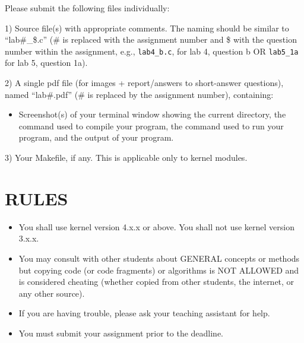 \documentclass{article}
\begin{document}
Please submit the following files individually:

1) Source file(s) with appropriate comments. The naming should be similar to “lab\#\_\$.c” (\# is replaced with the assignment number and \$ with the question number within the assignment, e.g., \texttt{lab4\_b.c}, for lab 4, question b OR \texttt{lab5\_1a} for lab 5, question 1a).

2) A single pdf file (for images + report/answers to short-answer questions), named “lab\#.pdf” (\# is replaced by the assignment number), containing:
    \begin{itemize}
        \item Screenshot(s) of your terminal window showing the current directory, the command used to compile your program, the command used to run your program, and the output of your program.
    \end{itemize}

3) Your Makefile, if any. This is applicable only to kernel modules.

\section*{RULES}

\begin{itemize}
    \item You shall use kernel version 4.x.x or above. You shall not use kernel version 3.x.x.
    \item You may consult with other students about GENERAL concepts or methods but copying code (or code fragments) or algorithms is NOT ALLOWED and is considered cheating (whether copied from other students, the internet, or any other source).
    \item If you are having trouble, please ask your teaching assistant for help.
    \item You must submit your assignment prior to the deadline.
\end{itemize}
\end{document}
